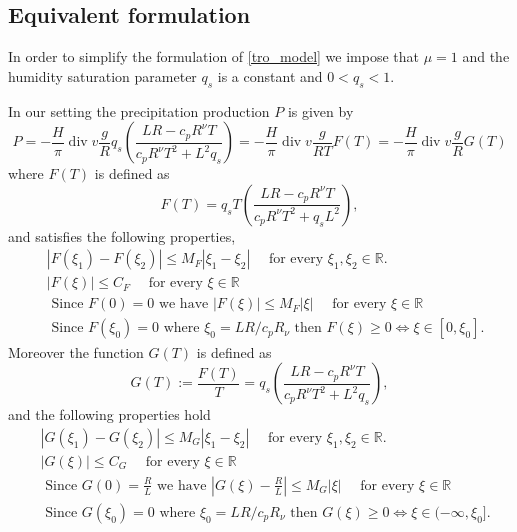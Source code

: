 \documentclass[11pt, a4paper, article,reqno,]{amsart}
\theoremstyle{remark}
\DeclareMathOperator{\dive}{div}
\numberwithin{equation}{section}
\begin{document}
\subsection{Equivalent formulation}\label{formal}
In order to simplify the formulation of \eqref{tro_model} we impose that $\mu=1$ and the humidity saturation parameter \( q_s \) is a constant and  $0<q_{s}<1$.

In our setting the precipitation production $P$  is given by
\begin{equation}\label{sourceq}
    P= - \frac{H}{\pi} \dive v  \frac{g}{R} q_s \left( \frac{LR- c_p R^{\nu} T}{c_p R^{\nu} T^2 + L^2 q_s} \right) 
    = -\frac{H}{\pi} \dive v  \frac{g}{RT} F(T) = -\frac{H}{\pi} \dive v  \frac{g}{R}G(T)
\end{equation}
where $F(T)$ is defined as
\begin{equation*}
    F(T)= q_s T \left( \frac{LR - c_p R^{\nu}T}{c_p R^{\nu}T^2 + q_sL^2} \right),
\end{equation*}
and satisfies the following properties,
\begin{align}\label{prop_F}
    & |F(\xi_1)-F(\xi_2)|\leq M_F |\xi_1 -\xi_2| \quad \text{ for every }\xi_1,\xi_2 \in \mathbb{R}. \\
    &|F(\xi)| \leq C_F \quad \text{ for every }  \xi \in \mathbb{R}  \nonumber \\
    & \text{ Since } F(0)=0 \text{ we have } |F(\xi)| \leq M_F|\xi| \quad \text{ for every } \xi \in \mathbb{R}  \nonumber \\
   & \text{ Since } F(\xi_0) = 0 \text{ where } \xi_0 = LR/c_pR_\nu \text{ then } F(\xi) \geq 0 \Longleftrightarrow \xi \in [0, \xi_0]  \nonumber.
\end{align}
Moreover the function $G(T)$ is defined as 
\begin{equation*}
    G(T):= \frac{F(T)}{T} = q_s \left( \frac{LR- c_p R^{\nu} T}{c_p R^{\nu} T^2 + L^2 q_s} \right),
\end{equation*}
and the following properties hold
    \begin{align}\label{prop_G}
    & |G(\xi_1)-G(\xi_2)|\leq M_G |\xi_1 -\xi_2| \quad \text{ for every }\xi_1,\xi_2 \in \mathbb{R}. \\
    &|G(\xi)| \leq C_G \quad \text{ for every }  \xi \in \mathbb{R}  \nonumber \\
    & \text{ Since } G(0)=\frac{R}{L} \text{ we have } \left |G(\xi) - \frac{R}{L}\right | \leq M_G|\xi| \quad \text{ for every } \xi \in \mathbb{R}  \nonumber \\
   & \text{ Since } G(\xi_0) = 0 \text{ where } \xi_0 = LR/c_pR_\nu \text{ then } G(\xi) \geq 0 \Longleftrightarrow \xi \in (- \infty, \xi_0]  \nonumber.
\end{align}
\end{document}
